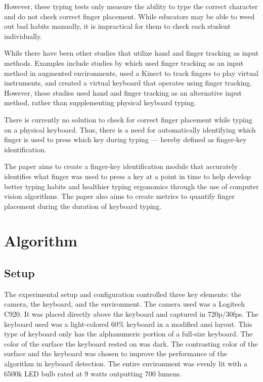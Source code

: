 \documentclass[preprint,12pt,authoryear]{elsarticle}
\begin{document}
However, these typing tests only measure the ability to type the correct
character and do not check correct finger placement. While educators may be able
to weed out bad habits manually, it is impractical for them to check each
student individually.

While there have been other studies that utilize hand and finger tracking as
input methods. Examples include studies by \citet{dorf2001} which used finger
tracking as an input method in augmented environments, \citet{chiang2014} used a
Kinect to track fingers to play virtual instruments, and \citet{yousaf2014}
created a virtual keyboard that operates using finger tracking. However, these
studies used hand and finger tracking as an alternative input method, rather
than supplementing physical keyboard typing.

There is currently no solution to check for correct finger placement while
typing on a physical keyboard. Thus, there is a need for automatically
identifying which finger is used to press which key during typing --- hereby
defined as finger-key identification.

The paper aims to create a finger-key identification module that accurately
identifies what finger was used to press a key at a point in time to help
develop better typing habits and healthier typing ergonomics through the use of
computer vision algorithms. The paper also aims to create metrics to quantify
finger placement during the duration of keyboard typing.

\section{Algorithm}

\subsection{Setup}
\label{section:metho-setup}

The experimental setup and configuration controlled three key elements: the
camera, the keyboard, and the environment. The camera used was a Logitech C920.
It was placed directly above the keyboard and captured in 720p/30fps. The
keyboard used was a light-colored 60\% keyboard in a modified \ac{ansi} layout.
This type of keyboard only has the alphanumeric portion of a full-size keyboard.
The color of the surface the keyboard rested on was dark. The contrasting color
of the surface and the keyboard was chosen to improve the performance of the
algorithm in keyboard detection. The entire environment was evenly lit with a
6500k LED bulb rated at 9 watts outputting 700 lumens.
\end{document}

